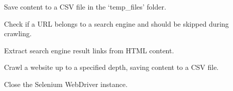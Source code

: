 \documentclass[letterpaper,10pt,english]{sphinxmanual}
\begin{document}
\begin{fulllineitems}
\begin{description}
\begin{description}
\sphinxAtStartPar
Save content to a CSV file in the ‘temp\_files’ folder.

\sphinxAtStartPar
Check if a URL belongs to a search engine and should be skipped during crawling.

\sphinxAtStartPar
Extract search engine result links from HTML content.

\sphinxAtStartPar
Crawl a website up to a specified depth, saving content to a CSV file.

\sphinxAtStartPar
Close the Selenium WebDriver instance.

\end{description}

\end{description}

\begin{fulllineitems}
\label{\detokenize{crawler:crawler.WebCrawler.clean_html_content}}
\pysigstartsignatures
{}
\pysigstopsignatures
\end{fulllineitems}


\begin{fulllineitems}
\label{\detokenize{crawler:crawler.WebCrawler.close}}
\pysigstartsignatures
{}
\pysigstopsignatures
\end{fulllineitems}


\begin{fulllineitems}
\label{\detokenize{crawler:crawler.WebCrawler.crawl_website_with_depth}}
\pysigstartsignatures
{}
\pysigstopsignatures
\end{fulllineitems}


\end{fulllineitems}
\end{document}
